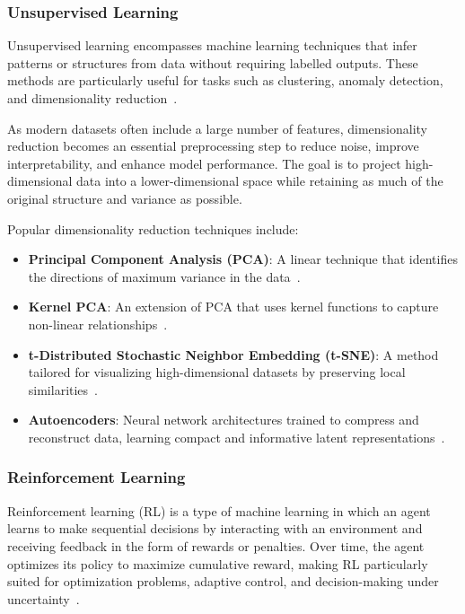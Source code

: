 \documentclass[class=scrbook, crop=false]{standalone}
\begin{document}
\subsubsection{Unsupervised Learning}

Unsupervised learning encompasses machine learning techniques that infer patterns or structures from data without requiring labelled outputs. These methods are particularly useful for tasks such as clustering, anomaly detection, and dimensionality reduction~\cite{bishop2006pattern}.

As modern datasets often include a large number of features, dimensionality reduction becomes an essential preprocessing step to reduce noise, improve interpretability, and enhance model performance. The goal is to project high-dimensional data into a lower-dimensional space while retaining as much of the original structure and variance as possible.

Popular dimensionality reduction techniques include:

\begin{itemize}
	\item \textbf{Principal Component Analysis (PCA)}: A linear technique that identifies the directions of maximum variance in the data~\cite{jolliffe2002principal}.
	\item \textbf{Kernel PCA}: An extension of PCA that uses kernel functions to capture non-linear relationships~\cite{scholkopf1998nonlinear}.
	\item \textbf{t-Distributed Stochastic Neighbor Embedding (t-SNE)}: A method tailored for visualizing high-dimensional datasets by preserving local similarities~\cite{maaten2008visualizing}.
	\item \textbf{Autoencoders}: Neural network architectures trained to compress and reconstruct data, learning compact and informative latent representations~\cite{hinton2006reducing}.
\end{itemize}

\subsubsection{Reinforcement Learning}

Reinforcement learning (RL) is a type of machine learning in which an agent learns to make sequential decisions by interacting with an environment and receiving feedback in the form of rewards or penalties. Over time, the agent optimizes its policy to maximize cumulative reward, making RL particularly suited for optimization problems, adaptive control, and decision-making under uncertainty~\cite{sutton2018reinforcement}.
\end{document}
